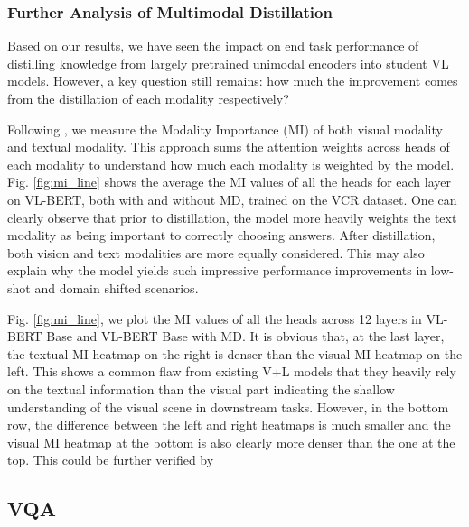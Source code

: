 \documentclass[runningheads]{llncs}
\begin{document}
\subsubsection{Further Analysis of Multimodal Distillation}
\label{sec:vcr-analysis}

Based on our results, we have seen the impact on end task performance of distilling knowledge from largely pretrained unimodal encoders into student VL models. However, a key question still remains: how much the improvement comes from the distillation of each modality respectively?


Following \cite{cao2020behind}, we measure the Modality Importance (MI) of both visual modality and textual modality. This approach sums the attention weights across heads of each modality to understand how much each modality is weighted by the model. Fig. \ref{fig:mi_line} shows the average the MI values of all the heads for each layer on VL-BERT, both with and without MD, trained on the VCR dataset. One can clearly observe that prior to distillation, the model more heavily weights the text modality as being important to correctly choosing answers. After distillation, both vision and text modalities are more equally considered. This may also explain why the model yields such impressive performance improvements in low-shot and domain shifted scenarios.

Fig. \ref{fig:mi_line}, we plot the MI values of all the heads across 12 layers in VL-BERT Base and VL-BERT Base with MD. It is obvious that, at the last layer, the textual MI heatmap on the right is denser than the visual MI heatmap on the left. This shows a common flaw from existing V+L models that they heavily rely on the textual information than the visual part indicating the shallow understanding of the visual scene in downstream tasks. However, in the bottom row, the difference between the left and right heatmaps is much smaller and the visual MI heatmap at the bottom is also clearly more denser than the one at the top. This could be further verified by










\subsection{VQA}
\end{document}
